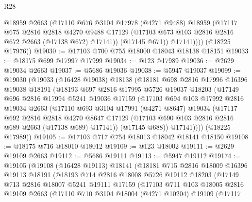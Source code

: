 \begin{lexlean}{R28}
\begin{coremodule}
              @18959
              @2663
              (@17110
                @676
                @3104
                @17978
                (@4271 @9488)
                @18959
                (@17117
                  @675
                  @2816
                  @2818
                  @4270
                  @9488
                  @17129
                  (@17103 @673 @103 @2816 @2816 @672 @2663 (@17138 @672) @17141))
                (@17145 @671))
              @17141))))
      (@18225 @17976))
@19030 := @17103 @700 @755 @18000 @18043 @18138 @18151
@19033 := @18175 @699 @17997 @17999
@19034 := @123 @17989
@19036 := @2629 @19034 @2663
@19037 := @5686 @19036
@19038 := @5947 @19037
@19099 := @19030
    (@19033
      (@16428 @19038)
      @18138
      (@18181
        @698
        @2816
        @17996
        @16396
        @19038
        @18191
        (@18193
          @697
          @2816
          @17995
          @5726
          @19037
          @18203
          (@17149
            @696
            @2816
            @17994
            @5241
            @19036
            @17159
            (@17103
              @694
              @103
              @17992
              @2816
              @19034
              @2663
              (@17110
                @693
                @3104
                @17991
                (@4271 @8647)
                @19034
                (@17117
                  @692
                  @2816
                  @2818
                  @4270
                  @8647
                  @17129
                  (@17103 @690 @103 @2816 @2816 @689 @2663 (@17138 @689) @17141))
                (@17145 @688))
              @17141))))
      (@18225 @17989))
@19105 := @17103 @717 @754 @18013 @18042 @18141 @18150
@19108 := @18175 @716 @18010 @18012
@19109 := @123 @18002
@19111 := @2629 @19109 @2663
@19112 := @5686 @19111
@19113 := @5947 @19112
@19174 := @19105
    (@19108
      (@16428 @19113)
      @18141
      (@18181
        @715
        @2816
        @18009
        @16396
        @19113
        @18191
        (@18193
          @714
          @2816
          @18008
          @5726
          @19112
          @18203
          (@17149
            @713
            @2816
            @18007
            @5241
            @19111
            @17159
            (@17103
              @711
              @103
              @18005
              @2816
              @19109
              @2663
              (@17110
                @710
                @3104
                @18004
                (@4271 @10204)
                @19109
                (@17117

\end{coremodule}
\end{lexlean}
